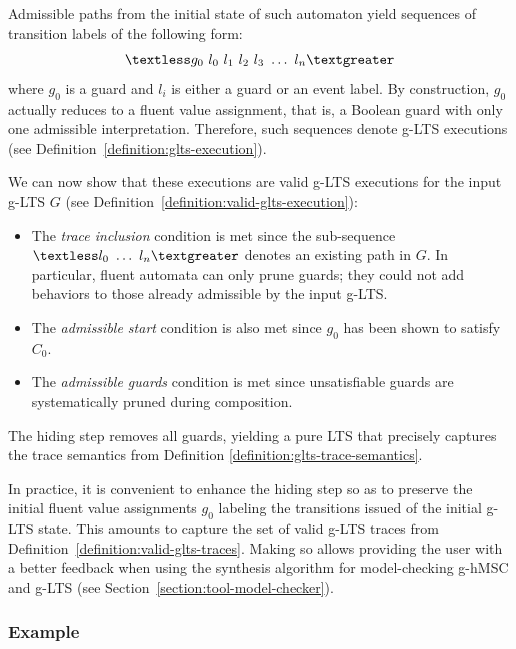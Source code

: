 Admissible paths from the initial state of such automaton yield sequences of transition labels of the following form:
\begin{align*}\textless g_0~l_0~l_1~l_2~l_3~\ldots~l_n \textgreater \end{align*}
where $g_0$ is a guard and $l_i$ is either a guard or an event label. By construction, $g_0$ actually reduces to a fluent value assignment, that is, a Boolean guard with only one admissible interpretation. Therefore, such sequences denote g-LTS executions (see Definition~\ref{definition:glts-execution}).

We can now show that these executions are valid g-LTS executions for the input g-LTS $G$ (see Definition~\ref{definition:valid-glts-execution}):
\begin{itemize}
\item The \emph{trace inclusion} condition is met since the sub-sequence $\textless l_0~\ldots~l_n \textgreater$ denotes an existing path in $G$. In particular, fluent automata can only prune guards; they could not add behaviors to those already admissible by the input g-LTS.
\item The \emph{admissible start} condition is also met since $g_0$ has been shown to satisfy $C_0$.
\item The \emph{admissible guards} condition is met since unsatisfiable guards are systematically pruned during composition.
\end{itemize}

The hiding step removes all guards, yielding a pure LTS that precisely captures the trace semantics from Definition \ref{definition:glts-trace-semantics}. 

In practice, it is convenient to enhance the hiding step so as to preserve the initial fluent value assignments $g_0$ labeling the transitions issued of the initial g-LTS state. This amounts to capture the set of valid g-LTS traces from Definition~\ref{definition:valid-glts-traces}. Making so allows providing the user with a better feedback when using the synthesis algorithm for model-checking g-hMSC and g-LTS (see Section~\ref{section:tool-model-checker}).

\subsubsection*{Example}

